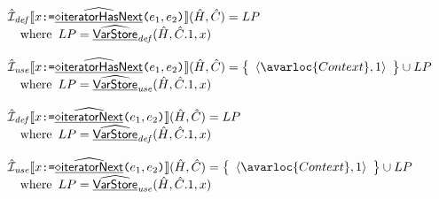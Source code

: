 \[
\begin{array}{l}
  \aI_{\it def}\lbr x \TT{:=} \ahfi{iteratorHasNext}\TT{(}e_1,e_2\TT{)} \rbr(\hat{H},\hat{C})
  = LP\\
  \quad\wherec{
    LP = \ahf{VarStore}_{\it def}(\hat{H},\hat{C}.1,x)
  }
  \\\\
  \aI_{\it use}\lbr x \TT{:=} \ahfi{iteratorHasNext}\TT{(}e_1,e_2\TT{)} \rbr(\hat{H},\hat{C})
  = \set{\langle \avarloc{Context}, 1\rangle} \cup LP\\
  \quad\wherec{
    LP = \ahf{VarStore}_{\it use}(\hat{H},\hat{C}.1,x)
  }
  \\\\
  \aI_{\it def}\lbr x \TT{:=} \ahfi{iteratorNext}\TT{(}e_1,e_2\TT{)} \rbr(\hat{H},\hat{C})
  = LP\\
  \quad\wherec{
    LP = \ahf{VarStore}_{\it def}(\hat{H},\hat{C}.1,x)
  }
  \\\\
  \aI_{\it use}\lbr x \TT{:=} \ahfi{iteratorNext}\TT{(}e_1,e_2\TT{)} \rbr(\hat{H},\hat{C})
  = \set{\langle \avarloc{Context}, 1\rangle} \cup LP\\
  \quad\wherec{
    LP = \ahf{VarStore}_{\it use}(\hat{H},\hat{C}.1,x)
  }
  \\\\
  

\end{array}\]
